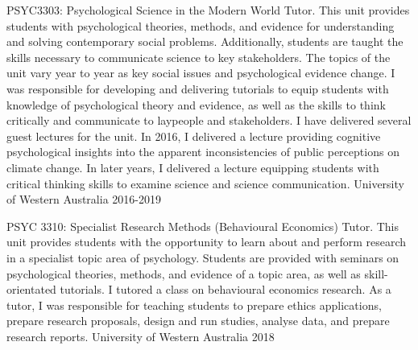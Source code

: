 \begin{minipage}{\textwidth}



\begin{cvhonors}

  \cvhonor
    {PSYC3303: Psychological Science in the Modern World} %
    {Tutor.\linebreak
    This unit provides students with psychological theories, methods, and evidence for understanding and solving contemporary social problems. Additionally, students are taught the skills necessary to communicate science to key stakeholders. The topics of the unit vary year to year as key social issues and psychological evidence change. I was responsible for developing and delivering tutorials to equip students with knowledge of psychological theory and evidence, as well as the skills to think critically and communicate to laypeople and stakeholders. I have delivered several guest lectures for the unit. In 2016, I delivered a lecture providing cognitive psychological insights into the apparent inconsistencies of public perceptions on climate change. In later years, I delivered a lecture equipping students with critical thinking skills to examine science and science communication.
    } %
    {University of Western Australia} %
    {2016-2019} %


  \cvhonor
    {PSYC 3310: Specialist Research Methods (Behavioural Economics)} %
    {Tutor.\linebreak
    This unit provides students with the opportunity to learn about and perform research in a specialist topic area of psychology. Students are provided with seminars on psychological theories, methods, and evidence of a topic area, as well as skill-orientated tutorials. I tutored a class on behavioural economics research. As a tutor, I was responsible for teaching students to prepare ethics applications, prepare research proposals, design and run studies, analyse data, and prepare research reports.
    } %
    {University of Western Australia} %
    {2018} %

\end{cvhonors}
\end{minipage}

